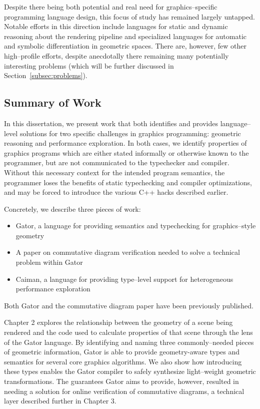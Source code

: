 Despite there being both potential and real need for graphics--specific programming language design, this focus of study has remained largely untapped.  Notable efforts in this direction include languages for static and dynamic reasoning about the rendering pipeline and specialized languages for automatic and symbolic differentiation in geometric spaces.  There are, however, few other high--profile efforts, despite anecdotally there remaining many potentially interesting problems (which will be further discussed in Section~\ref{subsec:problems}).

\subsection{Summary of Work}

In this dissertation, we present work that both identifies and provides language--level solutions for two specific challenges in graphics programming: geometric reasoning and performance exploration.  In both cases, we identify properties of graphics programs which are either stated informally or otherwise known to the programmer, but are not communicated to the typechecker and compiler.  Without this necessary context for the intended program semantics, the programmer loses the benefits of static typechecking and compiler optimizations, and may be forced to introduce the various C++ hacks described earlier.

Concretely, we describe three pieces of work:
%
\begin{itemize}
\item Gator, a language for providing semantics and typechecking for graphics--style geometry
\item A paper on commutative diagram verification needed to solve a technical problem within Gator
\item Caiman, a language for providing type--level support for heterogeneous performance exploration
\end{itemize}
%
Both Gator and the commutative diagram paper have been previously published.

Chapter 2 explores the relationship between the geometry of a scene being rendered and the code used to calculate properties of that scene through the lens of the Gator language.  By identifying and naming three commonly--needed pieces of geometric information, Gator is able to provide geometry-aware types and semantics for several core graphics algorithms.  We also show how introducing these types enables the Gator compiler to safely synthesize light--weight geometric transformations.  The guarantees Gator aims to provide, however, resulted in needing a solution for online verification of commutative diagrams, a technical layer described further in Chapter 3.

